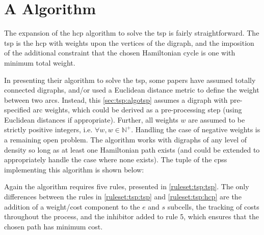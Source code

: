 \section{\label{sec:tsp:algotsp}A   Algorithm}

The expansion of the \gls{hcp} algorithm to solve the \gls{tsp} is fairly straightforward.  The \gls{tsp} is the \gls{hcp} with weights upon the vertices of the digraph, and the imposition of the additional constraint that the chosen Hamiltonian cycle is one with minimum total weight.  

In presenting their algorithm to solve the \gls{tsp}, some papers have assumed totally connected digraphs, and/or used a Euclidean distance metric to define the weight between two arcs.  Instead, this \cref{sec:tsp:algotsp} assumes a digraph with pre-specified arc weights, which could be derived as a pre-processing step (using Euclidean distances if appropriate).   Further, all weights \(w\) are assumed to be strictly positive integers, i.e. \(\forall w, w \in \mathbb{N}^+\).  Handling the case of negative weights is a remaining open problem.  The algorithm works with digraphs of any level of density so long as at least one Hamiltonian path exists (and could be extended to appropriately handle the case where none exists).  The tuple of the \glspl{cps} implementing this algorithm is shown below:


Again the algorithm requires five rules, presented in \cref{ruleset:tsp:tsp}.  The only differences between the rules in \cref{ruleset:tsp:tsp} and \cref{ruleset:tsp:hcp} are the addition of a weight/cost component to the \(e\) and \(s\) subcells, the tracking of costs throughout the process, and the inhibitor added to rule 5, which ensures that the chosen path has minimum cost.

